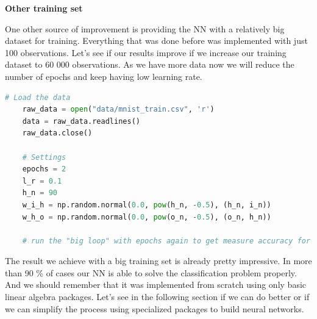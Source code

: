 \textbf{Other training set}

One other source of improvement is providing the NN with a relatively big dataset for training. Everything that was done before was implemented with just 100 observations. Let's see if our results improve if we increase our training dataset to 60 000 observations. As we have more data now we will reduce the number of epochs and keep having low learning rate.

\begin{lstlisting}[language=Python]   
    # Load the data
    raw_data = open("data/mnist_train.csv", 'r')
    data = raw_data.readlines()
    raw_data.close()
    
    # Settings
    epochs = 2
    l_r = 0.1
    h_n = 90
    w_i_h = np.random.normal(0.0, pow(h_n, -0.5), (h_n, i_n))
    w_h_o = np.random.normal(0.0, pow(o_n, -0.5), (o_n, h_n))
    
    # run the "big loop" with epochs again to get measure accuracy for new settings.
\end{lstlisting}

The result we achieve with a big training set is already pretty impressive. In more than 90 \% of cases our NN is able to solve the classification problem properly. And we should remember that it was implemented from scratch using only basic linear algebra packages. Let's see in the following section if we can do better or if we can simplify the process using specialized packages to build neural networks.